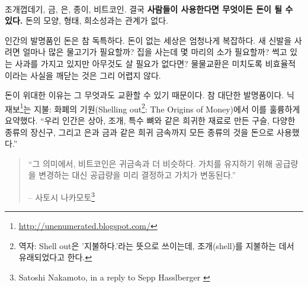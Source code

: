 \paragraph{}
\begin{comment}
	Seashells, gold, silver, paper, bitcoin. In the end, \textbf{money is whatever
		people use as money}, no matter its shape and form, or lack thereof.
\end{comment}
조개껍데기, 금, 은, 종이, 비트코인. 결국 \textbf{사람들이 사용한다면 무엇이든 돈이 될 수 있다.}
돈의 모양, 형태, 희소성과는 관계가 없다.

\begin{comment}
	Money, as an invention, is ingenious. 
	A world without money is insanely
	complicated: How many fish will buy me new shoes? How many cows will buy
	me a house? What if I don't need anything right now but I need to get
	rid of my soon-to-be rotten apples? You don't need a lot of imagination
	to realize that a barter economy is maddeningly inefficient.
\end{comment}
인간의 발명품인 돈은 참 독특하다. 
돈이 없는 세상은 엄청나게 복잡하다. 
새 신발을 사려면 얼마나 많은 물고기가 필요할까? 
집을 사는데 몇 마리의 소가 필요할까? 
썩고 있는 사과를 가지고 있지만 아무것도 살 필요가 없다면? 
물물교환은 미치도록 비효율적이라는 사실을 깨닫는 것은 그리 어렵지 않다.

\begin{comment}
	The great thing about money is that it can be exchanged for \textit{anything
		else} --- that's quite the invention! As Nick
	Szabo\footnote{\url{http://unenumerated.blogspot.com/}} brilliantly summarizes
	in \textit{Shelling Out: The Origins of Money} \cite{shelling-out}, we humans
	have used all kinds of things as money: beads made of rare materials like ivory,
	shells, or special bones, various kinds of jewelry, and later on rare metals
	like silver and gold.
\end{comment}
돈이 위대한 이유는 그 무엇과도 교환할 수 있기 때문이다. 
참 대단한 발명품이다. 
닉 재보\footnote{\url{http://unenumerated.blogspot.com/}}는 
지불: 화폐의 기원(Shelling out\footnote{역자: Shell out은 '지불하다.'라는 뜻으로 쓰이는데, 조개(shell)를 지불하는 데서 유래되었다고 한다.}: The Origins of Money)\cite{shelling-out}에서 이를 훌륭하게 요약했다.
\enquote{우리 인간은 상아, 조개, 특수 뼈와 같은 희귀한 재료로 만든 구슬, 다양한 종류의 장신구, 
	그리고 은과 금과 같은 희귀 금속까지 모든 종류의 것을 돈으로 사용했다.}

\begin{quotation}\begin{samepage}
		\enquote{그 의미에서, 비트코인은 귀금속과 더 비슷하다. 가치를 유지하기 위해 공급량을 변경하는 대신
			공급량을 미리 결정하고 가치가 변동된다.}
		\begin{flushright} -- 사토시 나카모토\footnote{Satoshi Nakamoto, in a reply to Sepp
				Hasslberger \cite{satoshi-precious-metal}}
\end{flushright}\end{samepage}\end{quotation}

